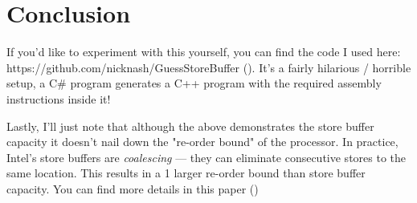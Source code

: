 \documentclass[11pt]{article}
\begin{document}
\section{Conclusion}

If you'd like to experiment with this yourself, you can find the code I used here: https://github.com/nicknash/GuessStoreBuffer (\texttt{}). It's a fairly hilarious / horrible setup, a C\# program generates a C++ program with the required assembly instructions inside it!

Lastly, I'll just note that although the above demonstrates the store buffer capacity it doesn't nail down the "re-order bound" of the processor. In practice, Intel's store buffers are \emph{coalescing} --- they can eliminate consecutive stores to the same location. This results in a 1 larger re-order bound than store buffer capacity. You can find more details in this paper (\texttt{})
\end{document}
